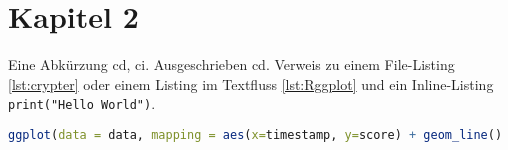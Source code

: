 \chapter{Kapitel 2}
\label{chap:kapitel2}
Eine Abkürzung \ac{cd}, \ac{ci}. Ausgeschrieben \acl{cd}. Verweis zu einem File-Listing
\ref{lst:crypter} oder einem Listing im Textfluss \ref{lst:Rggplot} und ein Inline-Listing
\lstinline|print("Hello World")|.



\begin{lstlisting}[language=R,caption=Beispielaufruf ldply-Funktion in R, label=lst:Rggplot]
ggplot(data = data, mapping = aes(x=timestamp, y=score) + geom_line()
\end{lstlisting}
			